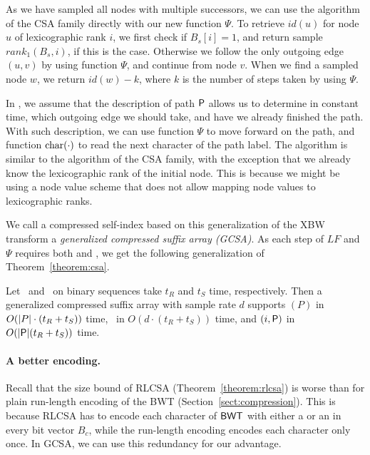 As we have sampled all nodes with multiple successors, we can use the \locate{} algorithm of the CSA family directly with our new function $\Psi$. To retrieve $id(u)$ for node $u$ of lexicographic rank $i$, we first check if $B_{s}[i] = 1$, and return sample $rank_{1}(B_{s}, i)$, if this is the case. Otherwise we follow the only outgoing edge $(u,v)$ by using function $\Psi$, and continue from node $v$. When we find a sampled node $w$, we return $id(w) - k$, where $k$ is the number of steps taken by using $\Psi$.

In \extract, we assume that the description of path $\mathsf{P}$ allows us to determine in constant time, which outgoing edge we should take, and have we already finished the path. With such description, we can use function $\Psi$ to move forward on the path, and function $\operatorname{char}(\cdot)$ to read the next character of the path label. The algorithm is similar to the \extract{} algorithm of the CSA family, with the exception that we already know the lexicographic rank of the initial node. This is because we might be using a node value scheme that does not allow mapping node values to lexicographic ranks.

We call a compressed self-index based on this generalization of the XBW transform a \emph{generalized compressed suffix array (GCSA)}. As each step of $LF$ and $\Psi$ requires both \rank{} and \select, we get the following generalization of Theorem~\ref{theorem:csa}.

\begin{theorem}\label{theorem:gcsa}
Let \rank\ and \select\ on binary sequences take $t_{R}$ and $t_{S}$ time, respectively. Then a generalized compressed suffix array with sample rate $d$ supports \find$(P)$ in $O(\lvert P \rvert \cdot (t_{R} + t_{S}))$ time, \locate\ in $O(d \cdot (t_{R} + t_{S}))$ time, and \extract$(i, \mathsf{P})$ in $O(\lvert \mathsf{P} \rvert(t_{R} + t_{S}))$ time.
\end{theorem}

\paragraph{A better encoding.}

Recall that the size bound of RLCSA (Theorem~\ref{theorem:rlcsa}) is worse than for plain run-length encoding of the BWT (Section~\ref{sect:compression}). This is because RLCSA has to encode each character of $\mathsf{BWT}$ with either a \zerobit{} or an \onebit{} in every bit vector $B_{c}$, while the run-length encoding encodes each character only once. In GCSA, we can use this redundancy for our advantage.

